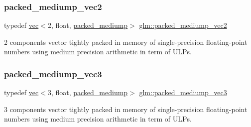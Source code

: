 \mbox{\label{group__gtc__type__aligned_ga16f6a2ad499160b96c263f7f216a70e2}} 
\subsubsection{\texorpdfstring{packed\+\_\+mediump\+\_\+vec2}{packed\_mediump\_vec2}}
{\footnotesize\ttfamily typedef \hyperlink{structglm_1_1vec}{vec}$<$2, float, \hyperlink{namespaceglm_a36ed105b07c7746804d7fdc7cc90ff25a9604654c3b137cd7898689fd34b25bc0}{packed\+\_\+mediump}$>$ \hyperlink{group__gtc__type__aligned_ga16f6a2ad499160b96c263f7f216a70e2}{glm\+::packed\+\_\+mediump\+\_\+vec2}}



2 components vector tightly packed in memory of single-\/precision floating-\/point numbers using medium precision arithmetic in term of U\+L\+Ps. 

\mbox{\label{group__gtc__type__aligned_ga34ad82503f637918457284618bef3a82}} 
\subsubsection{\texorpdfstring{packed\+\_\+mediump\+\_\+vec3}{packed\_mediump\_vec3}}
{\footnotesize\ttfamily typedef \hyperlink{structglm_1_1vec}{vec}$<$3, float, \hyperlink{namespaceglm_a36ed105b07c7746804d7fdc7cc90ff25a9604654c3b137cd7898689fd34b25bc0}{packed\+\_\+mediump}$>$ \hyperlink{group__gtc__type__aligned_ga34ad82503f637918457284618bef3a82}{glm\+::packed\+\_\+mediump\+\_\+vec3}}



3 components vector tightly packed in memory of single-\/precision floating-\/point numbers using medium precision arithmetic in term of U\+L\+Ps. 

